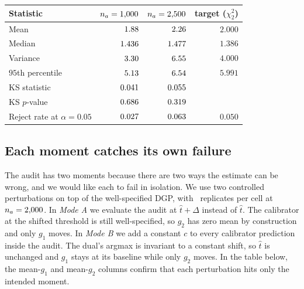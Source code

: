 \documentclass[11pt]{article}
\begin{document}
\begin{table}[H]
\centering
\setlength{\tabcolsep}{8pt}
\begin{tabular}{lrrr}
\toprule
Statistic & $n_a = 1{,}000$ & $n_a = 2{,}500$ & target ($\chi^2_2$) \\
\midrule
Mean                                  & $1.88$         & $2.26$         & $2.000$ \\
Median                                & $1.436$       & $1.477$       & $1.386$ \\
Variance                              & $3.30$          & $6.55$          & $4.000$ \\
$95$th percentile                     & $5.13$  & $6.54$  & $5.991$ \\
KS statistic                          & $0.041$           & $0.055$           & \\
KS $p$-value                          & $0.686$          & $0.319$          & \\
Reject rate at $\alpha = 0.05$         & $0.027$       & $0.063$       & $0.050$ \\
\bottomrule
\end{tabular}
\end{table}

\subsection{Each moment catches its own failure}
\label{app:moment-isolation}

The audit has two moments because there are two ways the estimate can be wrong, and we would like each to fail in isolation. We use two controlled perturbations on top of the well-specified DGP, with \modeNumReps\ replicates per cell at $n_a = 2{,}000$. In \emph{Mode A} we evaluate the audit at $\hat t + \Delta$ instead of $\hat t$. The calibrator at the shifted threshold is still well-specified, so $g_2$ has zero mean by construction and only $g_1$ moves. In \emph{Mode B} we add a constant $c$ to every calibrator prediction inside the audit. The dual's argmax is invariant to a constant shift, so $\hat t$ is unchanged and $g_1$ stays at its baseline while only $g_2$ moves. In the table below, the mean-$g_1$ and mean-$g_2$ columns confirm that each perturbation hits only the intended moment.
\end{document}
